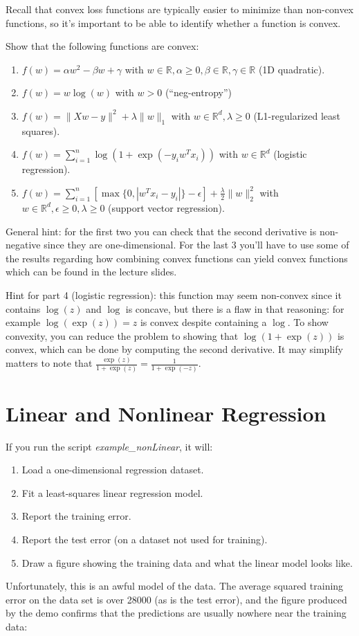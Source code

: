\documentclass{article}
\def\blu#1{{\color{blu}#1}}
\def\norm#1{\|#1\|}
\def\R{\mathbb{R}}
\newcommand{\centerfig}[2]{\begin{center}\texttt{[image: a3f/\#2]}\end{center}}
\def\enum#1{\begin{enumerate}#1\end{enumerate}}
\begin{document}
Recall that convex loss functions are typically easier to minimize than non-convex functions, so it's important to be able to identify whether a function is convex.

\blu{Show that the following functions are convex}:

\enum{
\item $f(w) = \alpha w^2 - \beta w + \gamma$ with $w \in \R, \alpha \geq 0, \beta \in \R, \gamma \in \R$ (1D quadratic).
\item $f(w) = w\log(w) $ with $w > 0$ (``neg-entropy'')
\item $f(w) = \norm{Xw-y}^2 + \lambda\norm{w}_1$ with $w \in \R^d, \lambda \geq 0$ (L1-regularized least squares).
\item $f(w) = \sum_{i=1}^n \log(1+\exp(-y_iw^Tx_i)) $ with $w \in \R^d$ (logistic regression).
\item $f(w) = \sum_{i=1}^n[\max\{0,|w^Tx_i - y_i|\} - \epsilon] + \frac{\lambda}{2}\norm{w}_2^2$  with $w \in \R^d, \epsilon \geq 0, \lambda \geq 0$ (support vector regression).
}

General hint: for the first two you can check that the second derivative is non-negative since they are one-dimensional. For the last 3 you'll have to use some of the results regarding how combining convex functions can yield convex functions which can be found in the lecture slides.

Hint for part 4 (logistic regression): this function may seem non-convex since it contains $\log(z)$ and $\log$ is concave, but there is a flaw in that reasoning: for example $\log(\exp(z))=z$ is convex despite containing a $\log$. To show convexity, you can reduce the problem to showing that $\log(1+\exp(z))$ is convex, which can be done by computing the second derivative. It may simplify matters to note that $\frac{\exp(z)}{1+\exp(z)} = \frac{1}{1+\exp(-z)}$.



\section{Linear and Nonlinear Regression}


If you run the script \emph{example\_nonLinear}, it will:
\enum{
\item Load a one-dimensional regression dataset.
\item Fit a least-squares linear regression model.
\item Report the training error.
\item Report the test error (on a dataset not used for training).
\item Draw a figure showing the training data and what the linear model looks like.
}
Unfortunately, this is an awful model of the data. The average squared training error on the data set is over 28000 (as is the test error), and the figure produced by the demo confirms that the predictions are usually nowhere near the training data:
\end{document}
